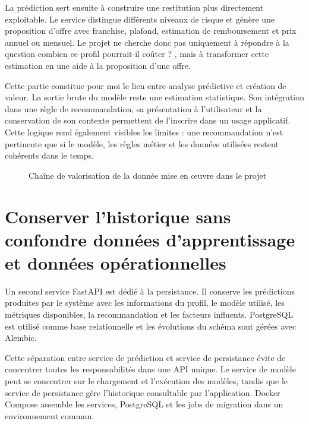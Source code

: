 La prédiction sert ensuite à construire une restitution plus directement exploitable. Le service distingue différents niveaux de risque et génère une proposition d'offre avec franchise, plafond, estimation de remboursement et prix annuel ou mensuel. Le projet ne cherche donc pas uniquement à répondre à la question \og combien ce profil pourrait-il coûter ? \fg, mais à transformer cette estimation en une aide à la proposition d'une offre.

Cette partie constitue pour moi le lien entre analyse prédictive et création de valeur. La sortie brute du modèle reste une estimation statistique. Son intégration dans une règle de recommandation, sa présentation à l'utilisateur et la conservation de son contexte permettent de l'inscrire dans un usage applicatif. Cette logique rend également visibles les limites : une recommandation n'est pertinente que si le modèle, les règles métier et les données utilisées restent cohérents dans le temps.

\begin{figure}[H]
\centering
{}
\caption{Chaîne de valorisation de la donnée mise en œuvre dans le projet}
\label{fig:insurance-flux-reel}
\end{figure}

\section{Conserver l'historique sans confondre données d'apprentissage et données opérationnelles}

Un second service FastAPI est dédié à la persistance. Il conserve les prédictions produites par le système avec les informations du profil, le modèle utilisé, les métriques disponibles, la recommandation et les facteurs influents. PostgreSQL est utilisé comme base relationnelle et les évolutions du schéma sont gérées avec Alembic.

Cette séparation entre service de prédiction et service de persistance évite de concentrer toutes les responsabilités dans une API unique. Le service de modèle peut se concentrer sur le chargement et l'exécution des modèles, tandis que le service de persistance gère l'historique consultable par l'application. Docker Compose assemble les services, PostgreSQL et les jobs de migration dans un environnement commun.

